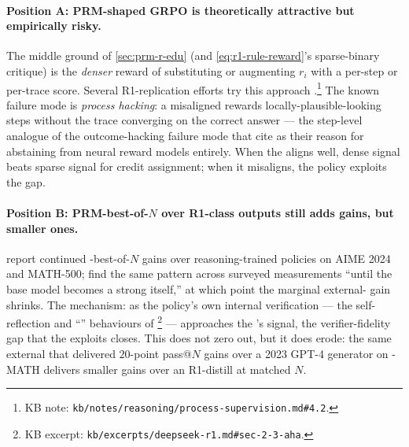 \paragraph{Position A: PRM-shaped GRPO is theoretically attractive but
empirically risky.} The middle ground of
\cref{sec:prm-r-edu} (and
\cref{eq:r1-rule-reward}'s sparse-binary critique) is the
\emph{denser} reward of substituting or augmenting $r_i$ with a
per-step or per-trace  score. Several R1-replication
efforts try this approach
\citep[\S 4]{thinkprm2025}.\footnote{KB note:
\nolinkurl{kb/notes/reasoning/process-supervision.md#4.2}.} The known
failure mode is \emph{process hacking}: a misaligned  rewards
locally-plausible-looking steps without the trace converging on the
correct answer --- the step-level analogue of the outcome-hacking
failure mode that \citet[\S 2.2]{deepseek-r1} cite as their reason for
abstaining from neural reward models entirely. When the  aligns
well, dense signal beats sparse signal for credit assignment; when it
misaligns, the policy exploits the gap.

\paragraph{Position B: PRM-best-of-$N$ over R1-class outputs still
adds gains, but smaller ones.}  report continued
-best-of-$N$ gains over reasoning-trained policies on AIME 2024
and MATH-500; \citet{zheng2025-prm-survey} find the same pattern
across surveyed measurements ``until the base model becomes a strong
 itself,'' at which point the marginal external-
gain shrinks. The
mechanism: as the policy's own internal verification --- the
self-reflection and ``'' behaviours of
\citet[\S 2.3]{deepseek-r1}\footnote{KB excerpt:
\nolinkurl{kb/excerpts/deepseek-r1.md#sec-2-3-aha}.} --- approaches the
's signal, the verifier-fidelity gap that the  exploits closes.
This does not zero out, but it does erode: the same external  that
delivered $20$-point pass@$N$ gains over a 2023 GPT-4 generator on
-MATH delivers smaller gains over an R1-distill at matched $N$.

